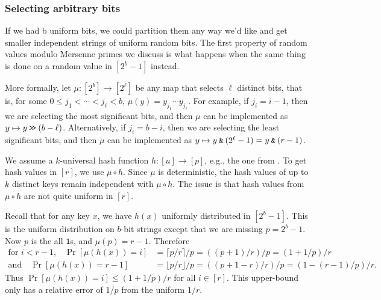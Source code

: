 

\subsubsection{Selecting arbitrary bits}\label{sec:power-of-two}
If we had b uniform bits, we could partition them any way we’d like and get smaller independent
strings of uniform random bits. The first property of random values modulo Mersenne primes
we discuss is what happens when the same thing is done on a random value in $[2^b - 1]$ instead.

More formally, let $\mu:[2^b]\to[2^\ell]$ be any map that selects
$\ell$ distinct bits, that is, for some $0\leq j_1<\cdots<j_{\ell}<b$,
$\mu(y)=y_{j_1}\cdots y_{j_\ell}$. For example, if $j_i=i-1$, then we
are selecting the most significant bits, and then $\mu$ can be
implemented as $y\mapsto y\mathbin{\texttt{>\!>}} (b-\ell)$. Alternatively, if $j_i=b-i$,
then we are selecting the least significant bits, and then $\mu$ can
be implemented as $y\mapsto y\mathbin{\texttt{\&}} (2^\ell-1)=y\mathbin{\texttt{\&}} (r-1)$.


We assume a $k$-universal hash function $h:[u]\to[p]$, e.g.,
the one from . To get hash values in $[r]$,
we use $\mu\circ h$. Since $\mu$ is deterministic,
the hash values of up to $k$ distinct keys remain
independent with $\mu\circ h$. The issue is that hash values from
$\mu\circ h$ are not quite uniform in $[r]$.

Recall that for any key $x$, we have $h(x)$ uniformly distributed in $[2^b-1]$.
This is the uniform distribution on $b$-bit strings except that we are
missing $p=2^b-1$. Now $p$ is the all \texttt{1}s, and
$\mu(p) = r-1$.
Therefore
\begin{align}
	\text{for $i < r-1$,}\quad
	\Pr[\mu(h(x))=i]
	 & =\lceil p/r\rceil/p
	=((p+1)/r)/p
	=(1+1/p)/r
	\label{eq:coll-ell<r-1}
	\\
	\text{and}\quad
	\Pr[\mu(h(x))=r-1]
	 & =\lfloor p/r\rfloor/p=((p+1-r)/r)/p
	=(1-(r-1)/p)/r.
	\label{eq:coll-ell=r-1}
\end{align}
Thus $\Pr[\mu(h(x))=i]\leq (1+1/p)/r$ for all $i\in[r]$.
This upper-bound only has a relative error of $1/p$ from the uniform $1/r$.

